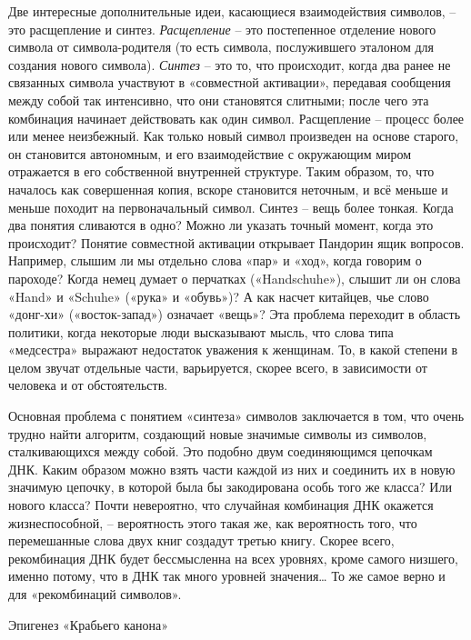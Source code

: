 \documentclass[../main.tex]{subfiles}
\begin{document}
Две интересные дополнительные идеи, касающиеся взаимодействия символов, \--- это расщепление и синтез. \emph{Расщепление} \--- это постепенное отделение нового символа от символа-родителя (то есть символа, послужившего эталоном для создания нового символа). \emph{Синтез} \--- это то, что происходит, когда два ранее не связанных символа участвуют в «совместной активации», передавая сообщения между собой так интенсивно, что они становятся слитными; после чего эта комбинация начинает действовать как один символ. Расщепление \--- процесс более или менее неизбежный. Как только новый символ произведен на основе старого, он становится автономным, и его взаимодействие с окружающим миром отражается в его собственной внутренней структуре. Таким образом, то, что началось как совершенная копия, вскоре становится неточным, и всё меньше и меньше походит на первоначальный символ. Синтез \--- вещь более тонкая. Когда два понятия сливаются в одно? Можно ли указать точный момент, когда это происходит? Понятие совместной активации открывает Пандорин ящик вопросов. Например, слышим ли мы отдельно слова «пар» и «ход», когда говорим о пароходе? Когда немец думает о перчатках («Handschuhe»), слышит ли он слова «Hand» и «Schuhe» («рука» и «обувь»)? А как насчет китайцев, чье слово «донг-хи» («восток-запад») означает «вещь»? Эта проблема переходит в область политики, когда некоторые люди высказывают мысль, что слова типа «медсестра» выражают недостаток уважения к женщинам. То, в какой степени в целом звучат отдельные части, варьируется, скорее всего, в зависимости от человека и от обстоятельств.

Основная проблема с понятием «синтеза» символов заключается в том, что очень трудно найти алгоритм, создающий новые значимые символы из символов, сталкивающихся между собой. Это подобно двум соединяющимся цепочкам ДНК\@. Каким образом можно взять части каждой из них и соединить их в новую значимую цепочку, в которой была бы закодирована особь того же класса? Или нового класса? Почти невероятно, что случайная комбинация ДНК окажется жизнеспособной, \--- вероятность этого такая же, как вероятность того, что перемешанные слова двух книг создадут третью книгу. Скорее всего, рекомбинация ДНК будет бессмысленна на всех уровнях, кроме самого низшего, именно потому, что в ДНК так много уровней значения\ldots{} То же самое верно и для «рекомбинаций символов».

Эпигенез «Крабьего канона»
\end{document}
